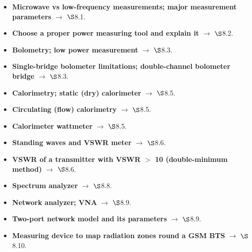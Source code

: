 
\begin{itemize}
  \item \textbf{Microwave vs low-frequency measurements; major measurement parameters}
    $\rightarrow$ $\S$8.1. 
  \item \textbf{Choose a proper power measuring tool and explain it} $\rightarrow$ $\S$8.2.
  \item \textbf{Bolometry; low power measurement} $\rightarrow$ $\S$8.3.
  \item \textbf{Single-bridge bolometer limitations; double-channel bolometer bridge}
    $\rightarrow$ $\S$8.3. 
  \item \textbf{Calorimetry; static (dry) calorimeter} $\rightarrow$ $\S$8.5.
  \item \textbf{Circulating (flow) calorimetry} $\rightarrow$ $\S$8.5.
  \item \textbf{Calorimeter wattmeter} $\rightarrow$ $\S$8.5. 
  \item \textbf{Standing waves and VSWR meter} $\rightarrow$ $\S$8.6.
  \item \textbf{VSWR of a transmitter with VSWR $>$ 10 (double-minimum method)}
    $\rightarrow$ $\S$8.6. 
  \item \textbf{Spectrum analyzer} $\rightarrow$ $\S$8.8.
  \item \textbf{Network analyzer; VNA} $\rightarrow$ $\S$8.9.
  \item \textbf{Two-port network model and its parameters} $\rightarrow$ $\S$8.9.
  \item \textbf{Measuring device to map radiation zones round a GSM BTS} $\rightarrow$
    $\S$8.10. 
\end{itemize}

